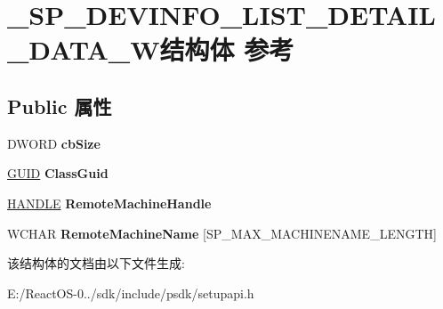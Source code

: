 \hypertarget{struct___s_p___d_e_v_i_n_f_o___l_i_s_t___d_e_t_a_i_l___d_a_t_a___w}{}\section{\+\_\+\+S\+P\+\_\+\+D\+E\+V\+I\+N\+F\+O\+\_\+\+L\+I\+S\+T\+\_\+\+D\+E\+T\+A\+I\+L\+\_\+\+D\+A\+T\+A\+\_\+\+W结构体 参考}
\label{struct___s_p___d_e_v_i_n_f_o___l_i_s_t___d_e_t_a_i_l___d_a_t_a___w}
\subsection*{Public 属性}
\begin{DoxyCompactItemize}
\item 
\mbox{\label{struct___s_p___d_e_v_i_n_f_o___l_i_s_t___d_e_t_a_i_l___d_a_t_a___w_a8503b63b8515f8278430f929c8f5bd8d}} 
D\+W\+O\+RD {\bfseries cb\+Size}
\item 
\mbox{\label{struct___s_p___d_e_v_i_n_f_o___l_i_s_t___d_e_t_a_i_l___d_a_t_a___w_a9edf3d25a746bdf72293a0f98eeba224}} 
\hyperlink{interface_g_u_i_d}{G\+U\+ID} {\bfseries Class\+Guid}
\item 
\mbox{\label{struct___s_p___d_e_v_i_n_f_o___l_i_s_t___d_e_t_a_i_l___d_a_t_a___w_a27f1e3887cf84dbc4229fb3ee5e28b61}} 
\hyperlink{interfacevoid}{H\+A\+N\+D\+LE} {\bfseries Remote\+Machine\+Handle}
\item 
\mbox{\label{struct___s_p___d_e_v_i_n_f_o___l_i_s_t___d_e_t_a_i_l___d_a_t_a___w_a6434daaec0b59ec6d505586683405004}} 
W\+C\+H\+AR {\bfseries Remote\+Machine\+Name} \mbox{[}S\+P\+\_\+\+M\+A\+X\+\_\+\+M\+A\+C\+H\+I\+N\+E\+N\+A\+M\+E\+\_\+\+L\+E\+N\+G\+TH\mbox{]}
\end{DoxyCompactItemize}


该结构体的文档由以下文件生成\+:\begin{DoxyCompactItemize}
\item 
E\+:/\+React\+O\+S-\/0../sdk/include/psdk/setupapi.\+h\end{DoxyCompactItemize}
